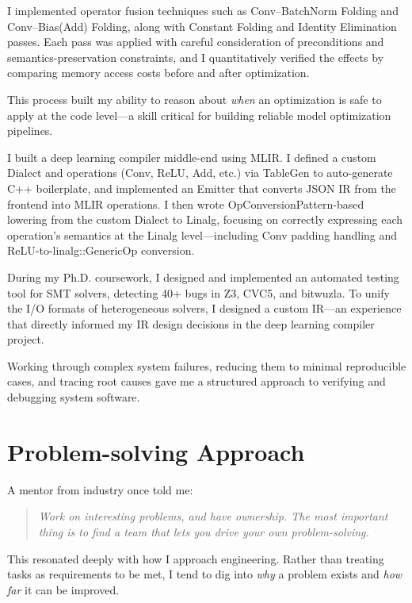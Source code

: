 \documentclass[a4paper,12pt]{article}
\begin{document}
I implemented operator fusion techniques
such as Conv--BatchNorm Folding and Conv--Bias(Add) Folding,
along with Constant Folding and Identity Elimination passes.
Each pass was applied with careful consideration of
preconditions and semantics-preservation constraints,
and I quantitatively verified the effects
by comparing memory access costs before and after optimization.

This process built my ability to reason about
\textit{when} an optimization is safe to apply at the code level---a
skill critical for building reliable model optimization pipelines.

I built a deep learning compiler middle-end using MLIR.
I defined a custom Dialect and operations (Conv, ReLU, Add, etc.)
via TableGen to auto-generate C++ boilerplate,
and implemented an Emitter that converts JSON IR from the frontend
into MLIR operations.
I then wrote OpConversionPattern-based lowering
from the custom Dialect to Linalg,
focusing on correctly expressing each operation's semantics
at the Linalg level---including Conv padding handling
and ReLU-to-linalg::GenericOp conversion.

During my Ph.D. coursework, I designed and implemented
an automated testing tool for SMT solvers,
detecting 40+ bugs in Z3, CVC5, and bitwuzla.
To unify the I/O formats of heterogeneous solvers,
I designed a custom IR---an experience
that directly informed my IR design decisions
in the deep learning compiler project.

Working through complex system failures,
reducing them to minimal reproducible cases,
and tracing root causes gave me a structured approach
to verifying and debugging system software.

\section{Problem-solving Approach}

A mentor from industry once told me:

\begin{quote}
\textit{Work on interesting problems, and have ownership.
The most important thing is to find a team that lets you
drive your own problem-solving.}
\end{quote}

This resonated deeply with how I approach engineering.
Rather than treating tasks as requirements to be met,
I tend to dig into \textit{why} a problem exists
and \textit{how far} it can be improved.
\end{document}
